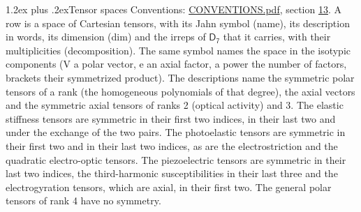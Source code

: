 \documentclass[10pt,a4paper]{article}
\makeatletter
\renewcommand\section{\@startsection{section}{1}{\z@}{-3ex plus -1ex minus -.2ex}%
  {1.2ex plus .2ex}{\normalfont\large\sffamily\bfseries\color{parttitle}}}
\numberwithin{equation}{section}
\newcommand{\grp}[1]{\mathsf{#1}}
\makeatother
\begin{document}
\section{Tensor spaces}\label{s:tensor_spaces}
Conventions: \href{../../CONVENTIONS.pdf}{CONVENTIONS.pdf}, section \href{../../CONVENTIONS.pdf\#conv.13}{13}.
\leavevmode\label{n:head.name}\label{n:head.description}\label{n:head.dim}\label{n:head.decomposition}A row is a space of Cartesian tensors, with its Jahn symbol (name), its description in words, its dimension (dim) and the irreps of $\grp{D_{7}}$ that it carries, with their multiplicities (decomposition). \label{n:label.jahn}The same symbol names the space in the isotypic components (V a polar vector, e an axial factor, a power the number of factors, brackets their symmetrized product). The descriptions name the symmetric polar tensors of a rank (the homogeneous polynomials of that degree), the axial vectors and the symmetric axial tensors of ranks 2 (optical activity) and 3. The elastic stiffness tensors are symmetric in their first two indices, in their last two and under the exchange of the two pairs. The photoelastic tensors are symmetric in their first two and in their last two indices, as are the electrostriction and the quadratic electro-optic tensors. The piezoelectric tensors are symmetric in their last two indices, the third-harmonic susceptibilities in their last three and the electrogyration tensors, which are axial, in their first two. The general polar tensors of rank 4 have no symmetry.
\end{document}
